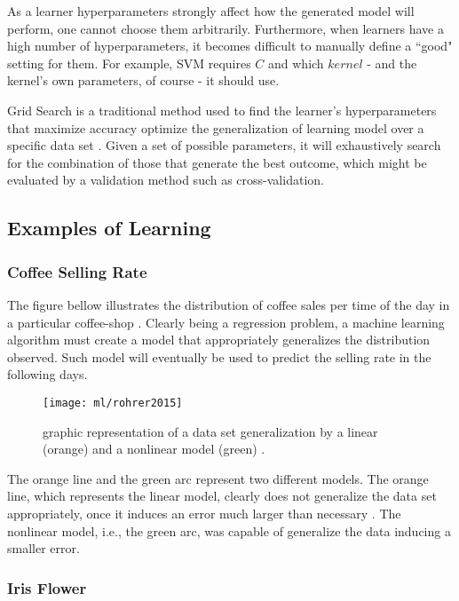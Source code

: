 As a learner hyperparameters strongly affect how the generated model will perform, one cannot choose them arbitrarily. Furthermore, when learners have a high number of hyperparameters, it becomes difficult to manually define a ``good" setting for them. For example, SVM requires $C$ and which $kernel$ - and the kernel's own parameters, of course - it should use.

Grid Search is a traditional method used to find the learner's hyperparameters that maximize accuracy optimize the generalization of learning model over a specific data set \cite{gridsearch}. Given a set of possible parameters, it will exhaustively search for the combination of those that generate the best outcome, which might be evaluated by a validation method such as cross-validation.

\subsection{Examples of Learning}

\subsubsection{Coffee Selling Rate}

The figure bellow illustrates the distribution of coffee sales per time of the day in a particular coffee-shop \cite{roh2015}. Clearly being a regression problem, a machine learning algorithm must create a model that appropriately generalizes the distribution observed. Such model will eventually be used to predict the selling rate in the following days.

\begin{figure}[H]
	\centering
	\captionsetup{justification=centering}

	\texttt{[image: ml/rohrer2015]}
	\caption{graphic representation of a data set generalization by a linear (orange) and a nonlinear model (green) \cite{roh2015}.}
	\label{fig:rohrer2015}
\end{figure}

The orange line and the green arc represent two different models. The orange line, which represents the linear model, clearly does not generalize the data set appropriately, once it induces an error much larger than necessary \cite{roh2015}. The nonlinear model, i.e., the green arc, was capable of generalize the data inducing a smaller error.

\subsubsection{Iris Flower}

